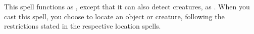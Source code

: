 \begin{spellheader}
\end{spellheader}
\begin{spellcontent}
    \begin{spelltargetinginfo}
        \spellrng{\rngext \rngunrestricted}
    \end{spelltargetinginfo}
    \begin{spelleffects}
        \spelleffect This spell functions as , except that it can also detect creatures, as . When you cast this spell, you choose to locate an object or creature, following the restrictions stated in the respective location spells.
        \spelldur \durmed
    \end{spelleffects}
\end{spellcontent}
